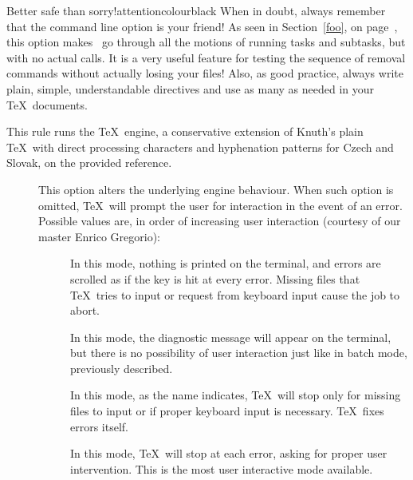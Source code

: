 \begin{description}
\begin{description}
\begin{messagebox}{Better safe than sorry!}{attentioncolour}{\icattention}{black}
When in doubt, always remember that the  command line option is your friend! As seen in Section~\ref{foo}, on page~\pageref{foo}, this option makes \arara\ go through all the motions of running tasks and subtasks, but with no actual calls. It is a very useful feature for testing the sequence of removal commands without actually losing your files! Also, as good practice, always write plain, simple, understandable  directives and use as many as needed in your \TeX\ documents.
\end{messagebox}
\end{description}

\item[\rulebox{csplain}{Paulo Cereda}] This rule runs the  \TeX\ engine, a conservative extension of Knuth's plain \TeX\ with direct processing characters and hyphenation patterns for Czech and Slovak, on the provided  reference.

\begin{description}
\item[] This option alters the underlying engine behaviour. When such option is omitted, \TeX\ will prompt the user for interaction in the event of an error. Possible values are, in order of increasing user interaction (courtesy of our master Enrico Gregorio):

\begin{description}
\item[] In this mode, nothing is printed on the terminal, and errors are scrolled as if the  key is hit at every error. Missing files that \TeX\ tries to input or request from keyboard input cause the job to abort.

\item[] In this mode, the diagnostic message will appear on the terminal, but there is no possibility of user interaction just like in batch mode, previously described.

\item[] In this mode, as the name indicates, \TeX\ will stop only for missing files to input or if proper keyboard input is necessary. \TeX\ fixes errors itself.

\item[] In this mode, \TeX\ will stop at each error, asking for proper user intervention. This is the most user interactive mode available.
\end{description}


\end{description}
\end{description}
